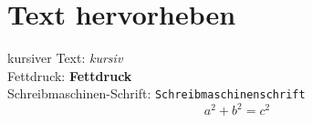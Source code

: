\chapter{Text hervorheben}
kursiver Text: \textit{kursiv}\\
Fettdruck: \textbf{Fettdruck}\\
Schreibmaschinen-Schrift: \texttt{Schreibmaschinenschrift}
\begin{equation} \label{gleichung}
	a^2 + b^2 = c^2
\end{equation}